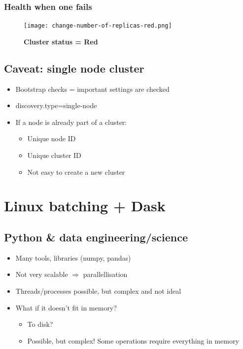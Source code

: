 \documentclass{article}
\begin{document}
\subsubsection{Health when one fails}

\begin{figure}[H]
    \centering
    \texttt{[image: change-number-of-replicas-red.png]}
    \caption{\textbf{Cluster status = Red}}
\end{figure}

\subsection{Caveat: single node cluster}

\begin{itemize}
    \item Bootstrap checks = important settings are checked
    \item discovery.type=single-node
    \item If a node is already part of a cluster:
    \begin{itemize}
        \item Unique node ID
        \item Unique cluster ID
        \item Not easy to create a new cluster
    \end{itemize}
\end{itemize}

\section{Linux batching + Dask}

\subsection{Python \& data engineering/science}

\begin{itemize}
    \item Many tools, libraries (numpy, pandas)
    \item Not very scalable $\Rightarrow$ parallellisation
    \item Threads/processes possible, but complex and not ideal
    \item What if it doesn't fit in memory?
    \begin{itemize}
        \item To disk?
        \item Possible, but complex! Some operations require everything in memory
    \end{itemize}
\end{itemize}
\end{document}

